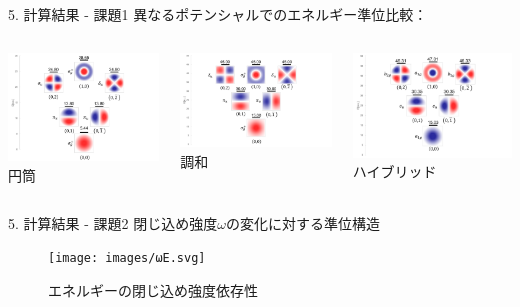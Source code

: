\documentclass[dvipdfmx]{beamer}
\begin{document}
\begin{frame}{5. 計算結果 - 課題1}
異なるポテンシャルでのエネルギー準位比較：

\begin{columns}
\includegraphics[width=\linewidth]{images/円筒準位図.png}
\centering 円筒

\includegraphics[width=\linewidth]{images/調和準位図.png}
\centering 調和

\includegraphics[width=\linewidth]{images/ハイブリッド準位図.png}
\centering ハイブリッド
\end{columns}
\end{frame}

\begin{frame}{5. 計算結果 - 課題2}
閉じ込め強度$\omega$の変化に対する準位構造

\begin{figure}[H]
\centering
\texttt{[image: images/ωE.svg]}
\caption{エネルギーの閉じ込め強度依存性}
\end{figure}
\end{frame}
\end{document}
